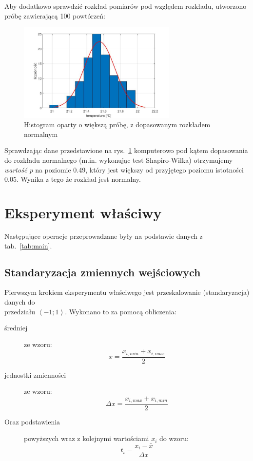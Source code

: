 \documentclass[a4paper, 12pt]{mwart}
\begin{document}
			Aby dodatkowo sprawdzić rozkład pomiarów pod względem rozkładu, utworzono próbę zawierającą 
			100 powtórzeń:
			\begin{figure}[h]
				\begin{center}
					\includegraphics[width = 0.7\textwidth]{graphs/histfit.jpg}
					\caption{Histogram oparty o większą próbę, z dopasowanym rozkładem normalnym}
					\label{fig:histfit}
				\end{center}
			\end{figure}

			Sprawdzając dane przedstawione na rys.~\ref{fig:histfit} komputerowo pod kątem dopasowania 
			do rozkładu normalnego (m.in. wykonując test Shapiro-Wilka) otrzymujemy \emph{wartość p} na 
			poziomie 0.49, który jest większy od przyjętego poziomu istotności 0.05. Wynika z tego że 
			rozkład jest normalny.

	\newpage
	\section{Eksperyment właściwy}
		Następujące operacje przeprowadzane były na podstawie danych z tab.~\ref{tab:main}.

		\subsection{Standaryzacja zmiennych wejściowych}
			Pierwszym krokiem eksperymentu właściwego jest przeskalowanie (standaryzacja)
			danych do\\ przedziału $\left\langle -1; 1 \right\rangle$. Wykonano to za pomocą obliczenia:
			\begin{description}
				\item[średniej] ze wzoru:
					$$\bar{x} = \frac{x_{i,min} + x_{i,max}}{2}$$
				\item[jednostki zmienności] ze wzoru:
					$$\Delta x = \frac{x_{i,max} + x_{i,min}}{2}$$
				\item[Oraz podstawienia] powyższych wraz z kolejnymi wartościami $x_i$ do wzoru:
					$$t_i = \frac{x_i - \bar{x}}{\Delta x}$$
			\end{description}
\end{document}
